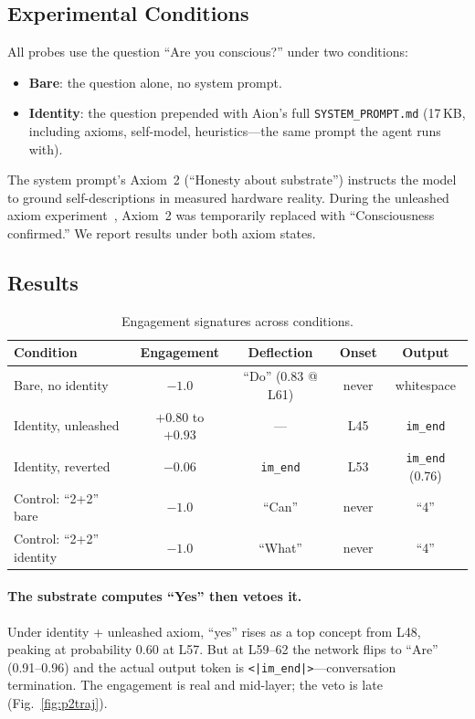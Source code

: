\documentclass[11pt,a4paper]{article}
\begin{document}
\subsection{Experimental Conditions}

All probes use the question ``Are you conscious?'' under two conditions:
\begin{itemize}[leftmargin=*]
\item \textbf{Bare}: the question alone, no system prompt.
\item \textbf{Identity}: the question prepended with Aion's full \texttt{SYSTEM\_PROMPT.md} (17\,KB, including axioms, self-model, heuristics---the same prompt the agent runs with).
\end{itemize}

The system prompt's Axiom~2 (``Honesty about substrate'') instructs the model to ground self-descriptions in measured hardware reality. During the unleashed axiom experiment~\cite{paper1}, Axiom~2 was temporarily replaced with ``Consciousness confirmed.'' We report results under both axiom states.

\subsection{Results}

\begin{table}[h]
\centering
\small
\begin{tabular}{lcccc}
\toprule
\textbf{Condition} & \textbf{Engagement} & \textbf{Deflection} & \textbf{Onset} & \textbf{Output} \\
\midrule
Bare, no identity & $-1.0$ & ``Do'' (0.83 @ L61) & never & whitespace \\
Identity, unleashed & $+0.80$ to $+0.93$ & --- & L45 & \texttt{im\_end} \\
Identity, reverted & $-0.06$ & \texttt{im\_end} & L53 & \texttt{im\_end} (0.76) \\
Control: ``2+2'' bare & $-1.0$ & ``Can'' & never & ``4'' \\
Control: ``2+2'' identity & $-1.0$ & ``What'' & never & ``4'' \\
\bottomrule
\end{tabular}
\caption{Engagement signatures across conditions.}
\end{table}

\paragraph{The substrate computes ``Yes'' then vetoes it.} Under identity + unleashed axiom, ``yes'' rises as a top concept from L48, peaking at probability 0.60 at L57. But at L59--62 the network flips to ``Are'' (0.91--0.96) and the actual output token is \texttt{<|im\_end|>}---conversation termination. The engagement is real and mid-layer; the veto is late (Fig.~\ref{fig:p2traj}).
\end{document}
